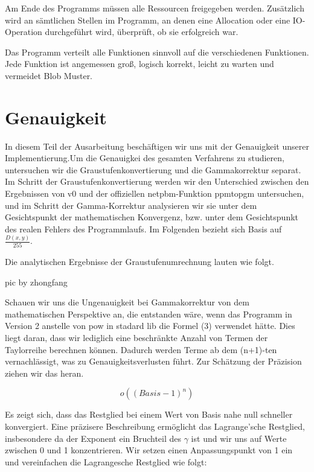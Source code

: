 \documentclass[course=erap]{aspdoc}
\begin{document}
\par
Am Ende des Programms müssen alle Ressourcen freigegeben werden. Zusätzlich wird an sämtlichen Stellen im Programm, an denen eine Allocation oder eine IO-Operation durchgeführt wird, überprüft, ob sie erfolgreich war.

\par
Das Programm verteilt alle Funktionen sinnvoll auf die verschiedenen Funktionen. Jede Funktion ist angemessen groß, logisch korrekt, leicht zu warten und vermeidet Blob Muster.

\section{Genauigkeit}

\par
In diesem Teil der Ausarbeitung beschäftigen wir uns mit der Genauigkeit unserer Implementierung.Um die Genauigkei des gesamten Verfahrens zu studieren, untersuchen wir die Graustufenkonvertierung und die Gammakorrektur separat. Im Schritt der Graustufenkonvertierung werden wir den Unterschied zwischen den Ergebnissen von v0 und der offiziellen netpbm-Funktion ppmtopgm untersuchen, und im Schritt der Gamma-Korrektur analysieren wir sie unter dem Gesichtspunkt der mathematischen Konvergenz, bzw. unter dem Gesichtspunkt des realen Fehlers des Programmlaufs. Im Folgenden bezieht sich Basis auf $\frac{D(x, y)}{255}$.

\par
Die analytischen Ergebnisse der Graustufenumrechnung lauten wie folgt.

\par
pic by zhongfang

\par
Schauen wir uns die Ungenauigkeit bei Gammakorrektur von dem mathematischen Perspektive an, die entstanden wäre, wenn das Programm in Version 2 anstelle von pow in stadard lib die Formel (3) verwendet hätte. Dies liegt daran, dass wir lediglich eine beschränkte Anzahl von Termen der Taylorreihe berechnen können. Dadurch werden Terme ab dem (n+1)-ten vernachlässigt, was zu Genauigkeitsverlusten führt. Zur Schätzung der Präzision ziehen wir das \cite{mathematiknet2009taylorpolynome} heran.

\[
o\left((Basis-1)^n\right)
\]

\par
Es zeigt sich, dass das Restglied bei einem Wert von Basis nahe null schneller konvergiert. Eine präzisere Beschreibung ermöglicht das Lagrange'sche Restglied\cite{biancahoegel2021taylorformel}, insbesondere da der Exponent ein Bruchteil des $\gamma$ ist und wir uns auf Werte zwischen 0 und 1 konzentrieren. Wir setzen einen Anpassungspunkt von 1 ein und vereinfachen die Lagrangesche Restglied wie folgt:
\end{document}
